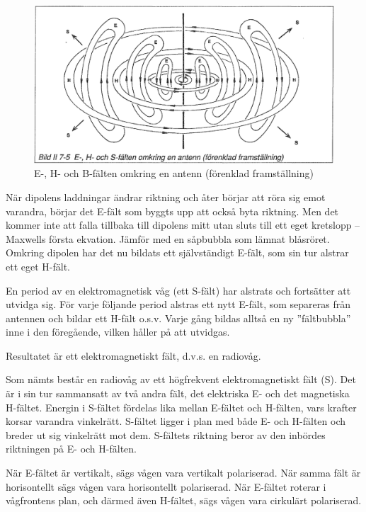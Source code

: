 \begin{figure}
\includegraphics[width=\textwidth]{images/bild_2_7-05}
\caption{E-, H- och B-fälten omkring en antenn (förenklad framställning)}
\label{fig:BildII7-05}
\end{figure}

När dipolens laddningar ändrar riktning och åter börjar att röra sig
emot varandra, börjar det E-fält som byggts upp att också byta
riktning. Men det kommer inte att falla tillbaka till dipolens mitt
utan sluts till ett eget kretslopp -- Maxwells första ekvation. Jämför
med en såpbubbla som lämnat blåsröret.  Omkring dipolen har det nu
bildats ett självständigt E-fält, som sin tur alstrar ett eget H-fält.

En period av en elektromagnetisk våg (ett S-fält) har alstrats och
fortsätter att utvidga sig. För varje följande period alstras ett nytt E-fält,
som separeras från antennen och bildar ett H-fält o.s.v. Varje gång bildas alltså en ny ''fältbubbla'' inne i den föregående, vilken håller på att utvidgas.

Resultatet är ett elektromagnetiskt fält, d.v.s. en radiovåg.

Som nämts består en radiovåg av ett högfrekvent elektromagnetiskt fält
(S). Det är i sin tur sammansatt av två andra fält, det elektriska E-
och det magnetiska H-fältet.  Energin i S-fältet fördelas lika mellan
E-fältet och H-fälten, vars krafter korsar varandra
vinkelrätt. S-fältet ligger i plan med både E- och H-fälten och breder
ut sig vinkelrätt mot dem. S-fältets riktning beror av den inbördes
riktningen på E- och H-fälten.

När E-fältet är vertikalt, sägs vågen vara vertikalt polariserad. När
samma fält är horisontellt sägs vågen vara horisontellt
polariserad. När E-fältet roterar i vågfrontens plan, och därmed även
H-fältet, sägs vågen vara cirkulärt polariserad.

